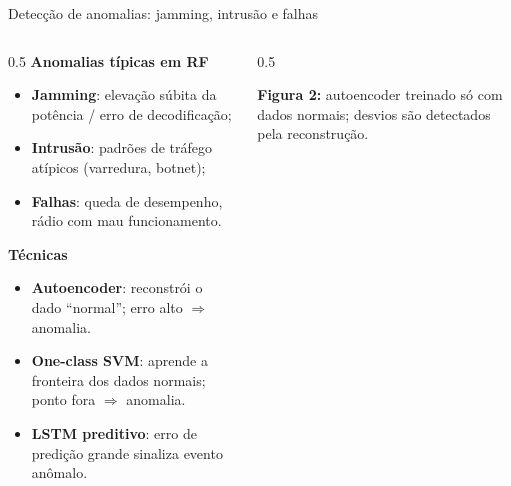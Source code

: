 \documentclass[aspectratio=169,11pt]{beamer}
\begin{document}
\begin{frame}{Detecção de anomalias: jamming, intrusão e falhas}
  \begin{columns}
    \begin{column}{0.5\textwidth}
      \textbf{Anomalias típicas em RF}
      \begin{itemize}
        \item \textbf{Jamming}: elevação súbita da potência / erro de decodificação;
        \item \textbf{Intrusão}: padrões de tráfego atípicos (varredura, botnet);
        \item \textbf{Falhas}: queda de desempenho, rádio com mau funcionamento.
      \end{itemize}
      \textbf{Técnicas}
      \begin{itemize}
        \item \textbf{Autoencoder}: reconstrói o dado ``normal''; erro alto $\Rightarrow$ anomalia.
        \item \textbf{One-class SVM}: aprende a fronteira dos dados normais; ponto fora $\Rightarrow$ anomalia.
        \item \textbf{LSTM preditivo}: erro de predição grande sinaliza evento anômalo.
      \end{itemize}
    \end{column}
    \begin{column}{0.5\textwidth}
      \begin{center}
      \end{center}
      \vspace{1mm}
      {\scriptsize \textbf{Figura 2:} autoencoder treinado só com dados normais; desvios são detectados pela reconstrução.}
    \end{column}
  \end{columns}
\end{frame}
\end{document}
